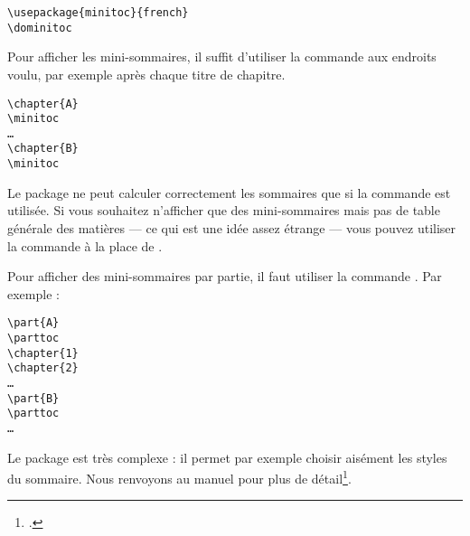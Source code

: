 \begin{verbatim}
\usepackage{minitoc}{french}
\dominitoc
\end{verbatim}

Pour afficher les mini-sommaires, il suffit d'utiliser la commande  aux endroits voulu, par exemple après chaque titre de chapitre.

\begin{verbatim}
\chapter{A}
\minitoc
…
\chapter{B}
\minitoc
\end{verbatim}

\begin{attention}
Le package ne peut calculer correctement les sommaires que si la commande  est utilisée. Si vous souhaitez n'afficher que des mini-sommaires mais pas de table générale des matières --- ce qui est une idée assez étrange --- vous pouvez utiliser  la commande  à la place de .
\end{attention}

Pour afficher des mini-sommaires par partie, il faut utiliser la commande . Par exemple :

\begin{verbatim}
\part{A}
\parttoc
\chapter{1}
\chapter{2}
…
\part{B}
\parttoc
…
\end{verbatim}


Le package  est très complexe : il permet par exemple choisir aisément les styles du sommaire. Nous renvoyons au manuel pour plus de détail\footcites{minitoc}[en particulier][]{minitoc_typesetting}.

